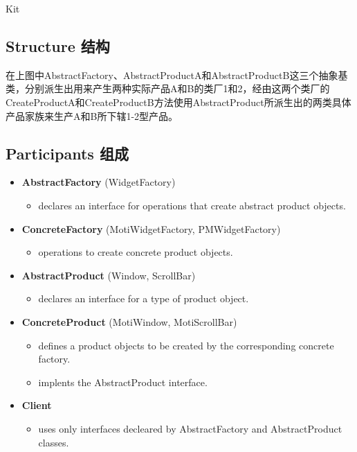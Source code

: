 Kit

\subsection{Structure 结构}


在上图中AbstractFactory、AbstractProductA和AbstractProductB这三个抽象基类，分别派生出用来产生两种实际产品A和B的类厂1和2，经由这两个类厂的CreateProductA和CreateProductB方法使用AbstractProduct所派生出的两类具体产品家族来生产A和B所下辖1-2型产品。

\subsection{Participants 组成}

\begin{itemize}
\small
\item \textbf{AbstractFactory} (WidgetFactory)

	\begin{itemize}
		\item declares an interface for operations that create abstract product objects.
	\end{itemize}

\item \textbf{ConcreteFactory} (MotiWidgetFactory, PMWidgetFactory)
	
	\begin{itemize}
		\item  operations to create concrete product objects.
	\end{itemize}

\item \textbf{AbstractProduct} (Window, ScrollBar)

	\begin{itemize}
		\item declares an interface for a type of product object.
	\end{itemize}

\item \textbf{ConcreteProduct} (MotiWindow, MotiScrollBar)

	\begin{itemize}
		\item defines a product objects to be created by the corresponding concrete factory.

		\item implents the AbstractProduct interface.
	\end{itemize}

\item \textbf{Client} 

	\begin{itemize}
		\item  uses only interfaces decleared by AbstractFactory and AbstractProduct classes.
	\end{itemize}
\normalize
\end{itemize}

